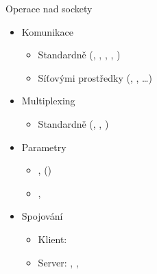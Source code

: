 \begin{frame}{Operace nad sockety}

  \begin{itemize}
    \item Komunikace
    \begin{itemize}
      \item Standardně (, , ,
	, )
      \item Síťovými prostředky (, , \dots)
    \end{itemize}

    \pause

    \item Multiplexing
    \begin{itemize}
      \item Standardně (, , )
    \end{itemize}

    \pause

    \item Parametry
    \begin{itemize}
      \item {},  ()
      \item {}, 
    \end{itemize}

    \pause

    \item Spojování
    \begin{itemize}
      \item Klient: 
      \item Server: , , 
    \end{itemize}
  \end{itemize}

\end{frame}

